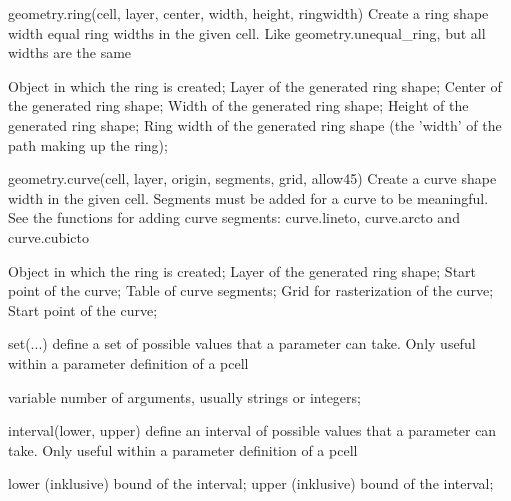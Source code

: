 \begin{APIfunc}{geometry.ring(cell, layer, center, width, height, ringwidth)}
    Create a ring shape width equal ring widths in the given cell. Like geometry.unequal\_ring, but all widths are the same
    \begin{APIparameters}
            Object in which the ring is created;
            Layer of the generated ring shape;
            Center of the generated ring shape;
            Width of the generated ring shape;
            Height of the generated ring shape;
            Ring width of the generated ring shape (the 'width' of the path making up the ring);
    \end{APIparameters}
\end{APIfunc}
\begin{APIfunc}{geometry.curve(cell, layer, origin, segments, grid, allow45)}
    Create a curve shape width in the given cell. Segments must be added for a curve to be meaningful. See the functions for adding curve segments: curve.lineto, curve.arcto and curve.cubicto
    \begin{APIparameters}
            Object in which the ring is created;
            Layer of the generated ring shape;
            Start point of the curve;
            Table of curve segments;
            Grid for rasterization of the curve;
            Start point of the curve;
    \end{APIparameters}
\end{APIfunc}
\begin{APIfunc}{set(...)}
    define a set of possible values that a parameter can take. Only useful within a parameter definition of a pcell
    \begin{APIparameters}
            variable number of arguments, usually strings or integers;
    \end{APIparameters}
\end{APIfunc}
\begin{APIfunc}{interval(lower, upper)}
    define an interval of possible values that a parameter can take. Only useful within a parameter definition of a pcell
    \begin{APIparameters}
            lower (inklusive) bound of the interval;
            upper (inklusive) bound of the interval;
    \end{APIparameters}
\end{APIfunc}
